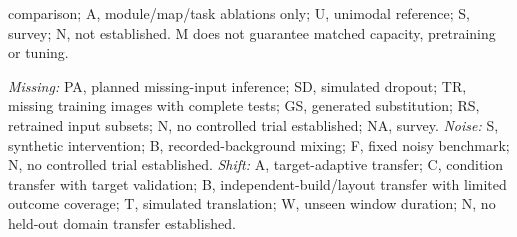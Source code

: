 comparison; A, module/map/task ablations only; U, unimodal reference; S, survey; N, not
established. M does not guarantee matched capacity, pretraining or tuning.
\par\noindent\textit{Missing:} PA, planned missing-input inference; SD, simulated
dropout; TR, missing training images with complete tests; GS, generated substitution;
RS, retrained input subsets; N, no controlled trial established; NA, survey.
\textit{Noise:} S, synthetic intervention; B, recorded-background mixing; F, fixed noisy
benchmark; N, no controlled trial established. \textit{Shift:} A, target-adaptive
transfer; C, condition transfer with target validation; B, independent-build/layout
transfer with limited outcome coverage; T, simulated translation; W, unseen window
duration; N, no held-out domain transfer established.

